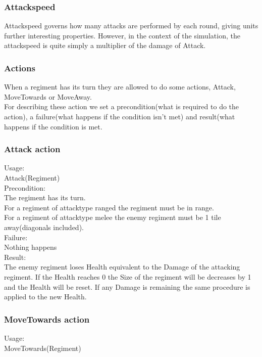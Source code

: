 		\subsubsection{Attackspeed}
		Attackspeed governs how many attacks are performed by each round, giving units further interesting properties. 
		However, in the context of the simulation, the attackspeed is quite simply a multiplier of the damage of Attack.
		
		\subsubsection{Actions}
		When a regiment has its turn they are allowed to do some actions, Attack, MoveTowards or MoveAway. \\
		For describing these action we set a precondition(what is required to do the action), a failure(what happens if the condition isn't met)
		and result(what happens if the condition is met.
		
		\subsubsection{Attack action}
		Usage: \\
		Attack(Regiment) \\
		
		Precondition: \\
		The regiment has its turn. \\
		For a regiment of attacktype ranged the regiment must be in range. \\
		For a regiment of attacktype melee the enemy regiment must be 1 tile away(diagonals included). \\
		
		Failure: \\
		Nothing happens \\
		
		Result: \\
		The enemy regiment loses Health equivalent to the Damage of the attacking regiment. If the Health reaches 0 the Size of the regiment
		will be decreases by 1 and the Health will be reset. If any Damage is remaining the same procedure is applied to the new Health.
		
		\subsubsection{MoveTowards action}
		Usage: \\
		MoveTowards(Regiment) \\
		
